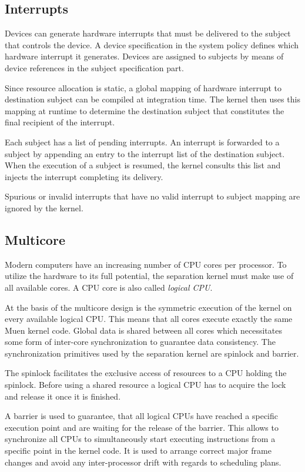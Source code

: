\subsection{Interrupts}
Devices can generate hardware interrupts that must be delivered to the subject
that controls the device. A device specification in the system policy defines
which hardware interrupt it generates. Devices are assigned to subjects by means
of device references in the subject specification part.

Since resource allocation is static, a global mapping of hardware interrupt to
destination subject can be compiled at integration time. The kernel then uses
this mapping at runtime to determine the destination subject that constitutes
the final recipient of the interrupt.

Each subject has a list of pending interrupts. An interrupt is forwarded to a
subject by appending an entry to the interrupt list of the destination subject.
When the execution of a subject is resumed, the kernel consults this list and
injects the interrupt completing its delivery.

Spurious or invalid interrupts that have no valid interrupt to subject mapping
are ignored by the kernel.

\subsection{Multicore}\label{subsec:multicore}
Modern computers have an increasing number of CPU cores per processor. To
utilize the hardware to its full potential, the separation kernel must make use
of all available cores. A CPU core is also called \emph{logical CPU}.

At the basis of the multicore design is the symmetric execution of the kernel on
every available logical CPU. This means that all cores execute exactly the same
Muen kernel code. Global data is shared between all cores which necessitates
some form of inter-core synchronization to guarantee data consistency. The
synchronization primitives used by the separation kernel are spinlock and
barrier.

The spinlock facilitates the exclusive access of resources to a CPU holding the
spinlock. Before using a shared resource a logical CPU has to acquire the lock
and release it once it is finished.

A barrier is used to guarantee, that all logical CPUs have reached a specific
execution point and are waiting for the release of the barrier. This allows to
synchronize all CPUs to simultaneously start executing instructions from a
specific point in the kernel code. It is used to arrange correct major frame
changes and avoid any inter-processor drift with regards to scheduling plans.

